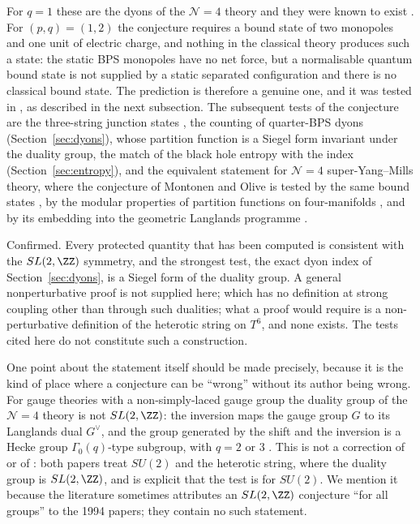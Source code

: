 For $q=1$ these are the dyons of the $\mathcal N=4$ theory and they were known to exist \cite{Osborn79}. For $(p,q) = (1,2)$ the conjecture requires a bound state of two monopoles and one unit of electric charge, and nothing in the classical theory produces such a state: the static BPS monopoles have no net force, but a normalisable quantum bound state is not supplied by a static separated configuration and there is no classical bound state. The prediction is therefore a genuine one, and it was tested in \cite{Sen94dyon}, as described in the next subsection. The subsequent tests of the conjecture are the three-string junction states \cite{Sen98network,Sen07junction}, the counting of quarter-BPS dyons (Section~\ref{sec:dyons}), whose partition function is a Siegel form invariant under the duality group, the match of the black hole entropy with the index (Section~\ref{sec:entropy}), and the equivalent statement for $\mathcal N=4$ super-Yang--Mills theory, where the conjecture of Montonen and Olive \cite{MontonenOlive77} is tested by the same bound states \cite{Sen94dyon,Porrati96,GauntlettLowe96,LeeWeinbergYi96}, by the modular properties of partition functions on four-manifolds \cite{VafaWitten94}, and by its embedding into the geometric Langlands programme \cite{KapustinWitten07}.

\begin{verdict}[claim 1]\label{ver:sl2z}
Confirmed. Every protected quantity that has been computed is consistent with the $SL(2,\ZZ)$ symmetry, and the strongest test, the exact dyon index of Section~\ref{sec:dyons}, is a Siegel form of the duality group. A general nonperturbative proof is not supplied here; which has no definition at strong coupling other than through such dualities; what a proof would require is a non-perturbative definition of the heterotic string on $T^6$, and none exists. The tests cited here do not constitute such a construction.
\end{verdict}

One point about the statement itself should be made precisely, because it is the kind of place where a conjecture can be ``wrong'' without its author being wrong. For gauge theories with a non-simply-laced gauge group the duality group of the $\mathcal N=4$ theory is not $SL(2,\ZZ)$: the inversion maps the gauge group $G$ to its Langlands dual $G^\vee$, and the group generated by the shift and the inversion is a Hecke group $\Gamma_0(q)$-type subgroup, with $q=2$ or $3$ \cite{GGPZ95,DFHK96,AKS06}. This is not a correction of \cite{Sen94duality} or of \cite{Sen94dyon}: both papers treat $SU(2)$ and the heterotic string, where the duality group is $SL(2,\ZZ)$, and \cite{Sen94dyon} is explicit that the test is for $SU(2)$. We mention it because the literature sometimes attributes an $SL(2,\ZZ)$ conjecture ``for all groups'' to the 1994 papers; they contain no such statement.

